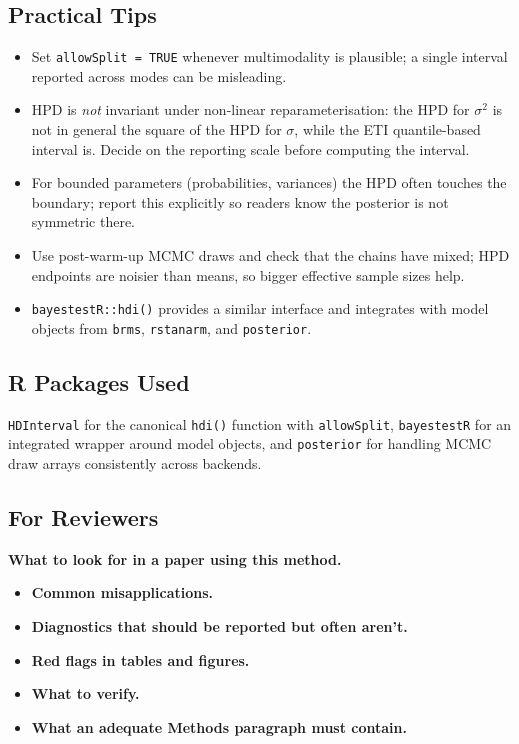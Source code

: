 \documentclass[
]{article}
\providecommand{\tightlist}{%
  \setlength{\itemsep}{0pt}\setlength{\parskip}{0pt}}
\begin{document}
\subsection{Practical Tips}\label{practical-tips}

\begin{itemize}
\tightlist
\item
  Set \texttt{allowSplit\ =\ TRUE} whenever multimodality is plausible;
  a single interval reported across modes can be misleading.
\item
  HPD is \emph{not} invariant under non-linear reparameterisation: the
  HPD for \(\sigma^2\) is not in general the square of the HPD for
  \(\sigma\), while the ETI quantile-based interval is. Decide on the
  reporting scale before computing the interval.
\item
  For bounded parameters (probabilities, variances) the HPD often
  touches the boundary; report this explicitly so readers know the
  posterior is not symmetric there.
\item
  Use post-warm-up MCMC draws and check that the chains have mixed; HPD
  endpoints are noisier than means, so bigger effective sample sizes
  help.
\item
  \texttt{bayestestR::hdi()} provides a similar interface and integrates
  with model objects from \texttt{brms}, \texttt{rstanarm}, and
  \texttt{posterior}.
\end{itemize}

\subsection{R Packages Used}\label{r-packages-used}

\texttt{HDInterval} for the canonical \texttt{hdi()} function with
\texttt{allowSplit}, \texttt{bayestestR} for an integrated wrapper
around model objects, and \texttt{posterior} for handling MCMC draw
arrays consistently across backends.

\subsection{For Reviewers}\label{for-reviewers}

\textbf{What to look for in a paper using this method.}

\begin{itemize}
\tightlist
\item
  \textbf{Common misapplications.}
\item
  \textbf{Diagnostics that should be reported but often aren't.}
\item
  \textbf{Red flags in tables and figures.}
\item
  \textbf{What to verify.}
\item
  \textbf{What an adequate Methods paragraph must contain.}
\end{itemize}
\end{document}
